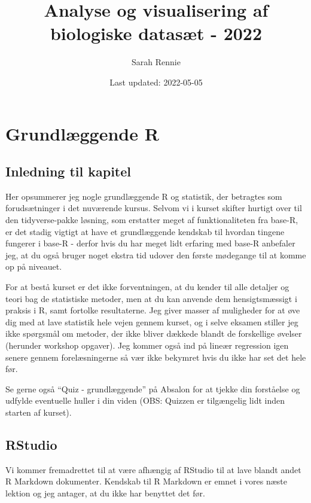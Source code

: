 \documentclass[
]{book}
\title{Analyse og visualisering af biologiske datasæt - 2022}
\author{Sarah Rennie}
\date{Last updated: 2022-05-05}
\begin{document}
\maketitle

{
\setcounter{tocdepth}{1}
\tableofcontents
}
\hypertarget{baser}{%
\chapter{Grundlæggende R}\label{baser}}

\hypertarget{inledning-til-kapitel}{%
\section{Inledning til kapitel}\label{inledning-til-kapitel}}

Her opsummerer jeg nogle grundlæggende R og statistik, der betragtes som forudsætninger i det nuværende kursus. Selvom vi i kurset skifter hurtigt over til den tidyverse-pakke løsning, som erstatter meget af funktionaliteten fra base-R, er det stadig vigtigt at have et grundlæggende kendskab til hvordan tingene fungerer i base-R - derfor hvis du har meget lidt erfaring med base-R anbefaler jeg, at du også bruger noget ekstra tid udover den første mødegange til at komme op på niveauet.

For at bestå kurset er det ikke forventningen, at du kender til alle detaljer og teori bag de statistiske metoder, men at du kan anvende dem hensigtsmæssigt i praksis i R, samt fortolke resultaterne. Jeg giver masser af muligheder for at øve dig med at lave statistik hele vejen gennem kurset, og i selve eksamen stiller jeg ikke spørgsmål om metoder, der ikke bliver dækkede blandt de forskellige øvelser (herunder workshop opgaver). Jeg kommer også ind på lineær regression igen senere gennem forelæsningerne så vær ikke bekymret hvis du ikke har set det hele før.

Se gerne også ``Quiz - grundlæggende'' på Absalon for at tjekke din forståelse og udfylde eventuelle huller i din viden (OBS: Quizzen er tilgængelig lidt inden starten af kurset).

\hypertarget{rstudio}{%
\section{RStudio}\label{rstudio}}

Vi kommer fremadrettet til at være afhængig af RStudio til at lave blandt andet R Markdown dokumenter. Kendskab til R Markdown er emnet i vores næste lektion og jeg antager, at du ikke har benyttet det før.
\end{document}
